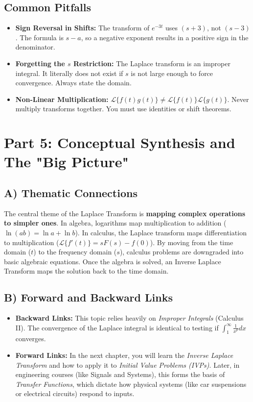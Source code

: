 \documentclass[11pt, a4paper]{article}
\theoremstyle{definition}
\theoremstyle{remark}
\begin{document}
\subsection{Common Pitfalls}
\begin{itemize}
    \item \textbf{Sign Reversal in Shifts:} The transform of $e^{-3t}$ uses $(s+3)$, not $(s-3)$. The formula is $s-a$, so a negative exponent results in a positive sign in the denominator.
    \item \textbf{Forgetting the $s$ Restriction:} The Laplace transform is an improper integral. It literally does not exist if $s$ is not large enough to force convergence. Always state the domain.
    \item \textbf{Non-Linear Multiplication:} $\mathscr{L}\{f(t)g(t)\} \neq \mathscr{L}\{f(t)\} \mathscr{L}\{g(t)\}$. Never multiply transforms together. You must use identities or shift theorems.
\end{itemize}

\newpage
\section{Part 5: Conceptual Synthesis and The "Big Picture"}

\subsection{A) Thematic Connections}
The central theme of the Laplace Transform is \textbf{mapping complex operations to simpler ones}. In algebra, logarithms map multiplication to addition ($\ln(ab) = \ln a + \ln b$). In calculus, the Laplace transform maps differentiation to multiplication ($\mathscr{L}\{f'(t)\} = sF(s) - f(0)$). By moving from the time domain ($t$) to the frequency domain ($s$), calculus problems are downgraded into basic algebraic equations. Once the algebra is solved, an Inverse Laplace Transform maps the solution back to the time domain.

\subsection{B) Forward and Backward Links}
\begin{itemize}
    \item \textbf{Backward Links:} This topic relies heavily on \textit{Improper Integrals} (Calculus II). The convergence of the Laplace integral is identical to testing if $\int_1^\infty \frac{1}{x^p} dx$ converges.
    \item \textbf{Forward Links:} In the next chapter, you will learn the \textit{Inverse Laplace Transform} and how to apply it to \textit{Initial Value Problems (IVPs)}. Later, in engineering courses (like Signals and Systems), this forms the basis of \textit{Transfer Functions}, which dictate how physical systems (like car suspensions or electrical circuits) respond to inputs.
\end{itemize}
\end{document}
